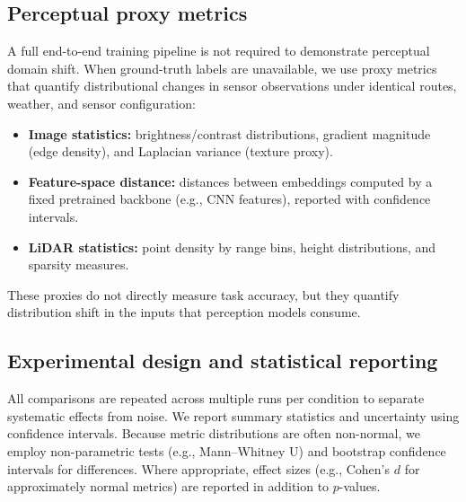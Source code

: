 \subsection{Perceptual proxy metrics}
\label{sec:perceptual_metrics}
A full end-to-end training pipeline is not required to demonstrate perceptual domain shift.
When ground-truth labels are unavailable, we use proxy metrics that quantify distributional changes in sensor observations under identical routes, weather, and sensor configuration:
\begin{itemize}
    \item \textbf{Image statistics:} brightness/contrast distributions, gradient magnitude (edge density), and Laplacian variance (texture proxy).
    \item \textbf{Feature-space distance:} distances between embeddings computed by a fixed pretrained backbone (e.g., CNN features), reported with confidence intervals.
    \item \textbf{LiDAR statistics:} point density by range bins, height distributions, and sparsity measures.
\end{itemize}
These proxies do not directly measure task accuracy, but they quantify distribution shift in the inputs that perception models consume.


\subsection{Experimental design and statistical reporting}
\label{sec:stats}
All comparisons are repeated across multiple runs per condition to separate systematic effects from noise.
We report summary statistics and uncertainty using confidence intervals.
Because metric distributions are often non-normal, we employ non-parametric tests (e.g., Mann--Whitney U) and bootstrap confidence intervals for differences.
Where appropriate, effect sizes (e.g., Cohen's $d$ for approximately normal metrics) are reported in addition to $p$-values.



